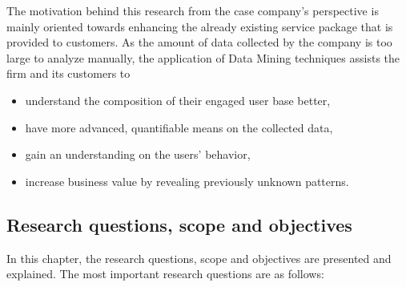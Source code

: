    The motivation behind this research from the case company's perspective is mainly oriented towards enhancing the already existing service package that is provided to customers. As the amount of data collected by the company is too large to analyze manually, the application of Data Mining techniques assists the firm and its customers to

    \begin{itemize}
        \item understand the composition of their engaged user base better,
        \item have more advanced, quantifiable means on the collected data,
        \item gain an understanding on the users' behavior, 
        \item increase business value by revealing previously unknown patterns.
    \end{itemize} 

\subsection{Research questions, scope and objectives}
In this chapter, the research questions, scope and objectives are presented and explained. The most important research questions are as follows:

